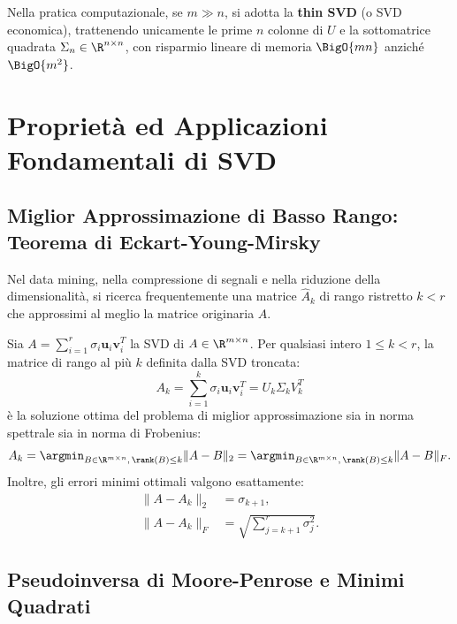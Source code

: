 Nella pratica computazionale, se $m \gg n$, si adotta la \textbf{thin SVD} (o SVD economica), trattenendo unicamente le prime $n$ colonne di $U$ e la sottomatrice quadrata $\Sigma_n \in \R^{n \times n}$, con risparmio lineare di memoria $\BigO{m n}$ anziché $\BigO{m^2}$.

\FloatBarrier
\section{Proprietà ed Applicazioni Fondamentali di SVD}

\subsection{Miglior Approssimazione di Basso Rango: Teorema di Eckart-Young-Mirsky}

Nel data mining, nella compressione di segnali e nella riduzione della dimensionalità, si ricerca frequentemente una matrice $\hat{A}_k$ di rango ristretto $k < r$ che approssimi al meglio la matrice originaria $A$.

\begin{theorem}
Sia $A = \sum_{i=1}^r \sigma_i \mathbf{u}_i \mathbf{v}_i^T$ la SVD di $A \in \R^{m \times n}$. Per qualsiasi intero $1 \le k < r$, la matrice di rango al più $k$ definita dalla SVD troncata:
\begin{equation}
    A_k = \sum_{i=1}^k \sigma_i \mathbf{u}_i \mathbf{v}_i^T = U_k \Sigma_k V_k^T
\end{equation}
è la soluzione ottima del problema di miglior approssimazione sia in norma spettrale sia in norma di Frobenius:
\begin{equation}
    A_k = \argmin_{B \in \R^{m \times n},\, \rank(B) \le k} \|A - B\|_2 = \argmin_{B \in \R^{m \times n},\, \rank(B) \le k} \|A - B\|_F.
\end{equation}
Inoltre, gli errori minimi ottimali valgono esattamente:
\begin{align}
    \|A - A_k\|_2 &= \sigma_{k+1}, \\
    \|A - A_k\|_F &= \sqrt{\sum_{j=k+1}^r \sigma_j^2}.
\end{align}
\end{theorem}

\subsection{Pseudoinversa di Moore-Penrose e Minimi Quadrati}

